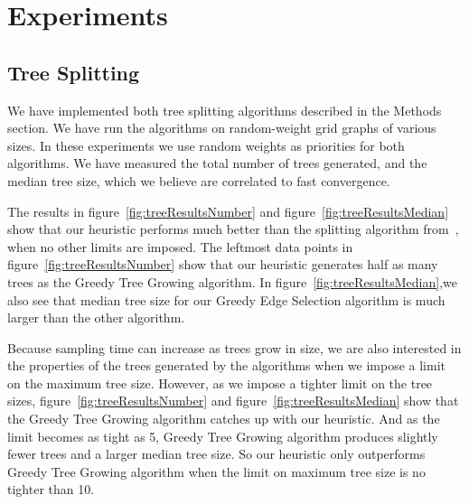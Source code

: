 \documentclass{article} %
\begin{document}
\section{Experiments}

\subsection{Tree Splitting}%

We have implemented both tree splitting algorithms described in the
Methods section.  We have run the algorithms on random-weight grid
graphs of various sizes. In these experiments we use random weights as
priorities for both algorithms. We have measured the total number of
trees generated, and the median tree size, which we believe are
correlated to fast convergence.

The results in figure~\ref{fig:treeResultsNumber} and
figure~\ref{fig:treeResultsMedian} show that our heuristic performs
much better than the splitting algorithm
from~\cite{rivasseau2005jungle}, when no other limits are imposed.
The leftmost data points in figure~\ref{fig:treeResultsNumber} show
that our heuristic generates half as many trees as the Greedy Tree
Growing algorithm. In figure~\ref{fig:treeResultsMedian},we also see
that median tree size for our Greedy Edge Selection algorithm is much
larger than the other algorithm.

Because sampling time can increase as trees grow in size, we are also
interested in the properties of the trees generated by the algorithms
when we impose a limit on the maximum tree size. However, as we impose
a tighter limit on the tree sizes, figure~\ref{fig:treeResultsNumber}
and figure~\ref{fig:treeResultsMedian} show that the Greedy Tree
Growing algorithm catches up with our heuristic. And as the limit
becomes as tight as 5, Greedy Tree Growing algorithm produces slightly
fewer trees and a larger median tree size. So our heuristic only
outperforms Greedy Tree Growing algorithm when the limit on maximum
tree size is no tighter than 10.
\end{document}
